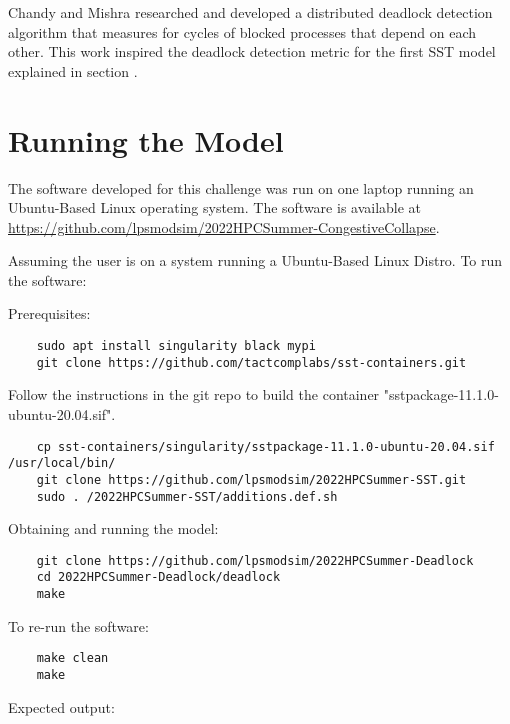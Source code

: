 \documentclass{article}
\begin{document}
Chandy and Mishra \cite{1983_Chandy} researched and developed a distributed deadlock detection algorithm that measures for cycles of blocked processes that depend on each other. This work inspired the deadlock detection metric for the first SST model explained in section .

\section{Running the Model}

The software developed for this challenge was run on one laptop running an Ubuntu-Based Linux operating system. The software is available at \href{https://github.com/lpsmodsim/2022HPCSummer-CongestiveCollapse}{https://github.com/lpsmodsim/2022HPCSummer-CongestiveCollapse}.\newline

\noindent Assuming the user is on a system running a Ubuntu-Based Linux Distro. To run the software:\newline

\noindent Prerequisites: 

\begin{verbatim}
	sudo apt install singularity black mypi
	git clone https://github.com/tactcomplabs/sst-containers.git
\end{verbatim}

\noindent Follow the instructions in the git repo to build the container "sstpackage-11.1.0-ubuntu-20.04.sif".

\begin{verbatim}
	cp sst-containers/singularity/sstpackage-11.1.0-ubuntu-20.04.sif /usr/local/bin/
	git clone https://github.com/lpsmodsim/2022HPCSummer-SST.git
	sudo . /2022HPCSummer-SST/additions.def.sh
\end{verbatim}

\noindent Obtaining and running the model:

\begin{verbatim}
	git clone https://github.com/lpsmodsim/2022HPCSummer-Deadlock
	cd 2022HPCSummer-Deadlock/deadlock
	make
\end{verbatim}

\noindent To re-run the software:

\begin{verbatim}
	make clean
	make
\end{verbatim}

\noindent Expected output:
\end{document}
